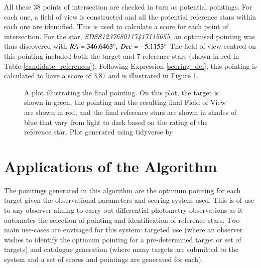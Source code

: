 \documentclass{aa}
\begin{document}
All these 38 points of intersection are checked in turn as potential pointings. For each one, a field of view is constructed and all the potential reference stars within each one are identified. This is used to calculate a score for each point of intersection. For the star, \textit{SDSS1237680117417115655}, an optimised pointing was thus discovered with ${RA = 346.6463\degree},\ {Dec = -5.1153\degree}$ The field of view centred on this pointing included both the target and 7 reference stars (shown in red in Table \ref{candidate_references}). Following Expression \ref{scoring_def}, this pointing is calculated to have a score of 3.87 and is illustrated in Figure \ref{locus_plot}.

\begin{figure}[!htb]
\caption{\label{locus_plot}A plot illustrating the final pointing.  On this plot, the target is shown in green, the pointing and the resulting final Field of View are shown in red, and the final reference stars are shown in shades of blue that vary from light to dark based on the rating of the reference star. Plot generated using tidyverse by \citet{tidyverse}}
\end{figure}


\section{Applications of the Algorithm}
\label{Applications}
The pointings generated in this algorithm are the optimum pointing for each target given the observational parameters and scoring system used. This is of use to any observer aiming to carry out differential photometry observations as it automates the selection of pointing and identification of reference stars. Two main use-cases are envisaged for this system: targeted use (where an observer wishes to identify the optimum pointing for a pre-determined target or set of targets) and catalogue generation (where many targets are submitted to the system and a set of scores and pointings are generated for each). 
\end{document}
